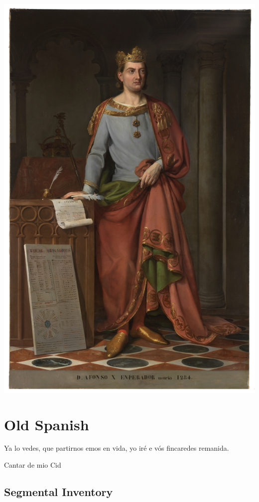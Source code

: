 \documentclass{report}[12pt]
\begin{document}
\includegraphics[scale=0.45]{alfonso_x.jpg}

\thispagestyle{empty}

\pagebreak

\chapter{Old Spanish}

\epigraph{Ya lo vedes, que partirnos emos en vida, yo iré e vós fincaredes remanida.}{Cantar de mio Cid}

\section{Segmental Inventory}
\end{document}
